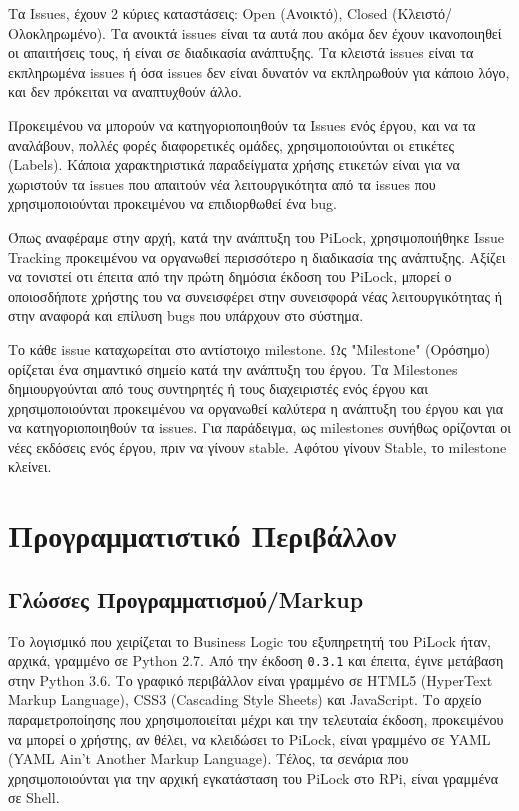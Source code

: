 		Τα Issues, έχουν 2 κύριες καταστάσεις: Open (Ανοικτό), Closed (Κλειστό/Ολοκληρωμένο). Τα ανοικτά issues είναι τα αυτά που ακόμα δεν έχουν ικανοποιηθεί οι απαιτήσεις τους, ή είναι σε διαδικασία ανάπτυξης. Τα κλειστά issues είναι τα εκπληρωμένα issues ή όσα issues δεν είναι δυνατόν να εκπληρωθούν για κάποιο λόγο, και δεν πρόκειται να αναπτυχθούν άλλο.

		Προκειμένου να μπορούν να κατηγοριοποιηθούν τα Issues ενός έργου, και να τα αναλάβουν, πολλές φορές διαφορετικές ομάδες, χρησιμοποιούνται οι ετικέτες (Labels). Κάποια χαρακτηριστικά παραδείγματα χρήσης ετικετών είναι για να χωριστούν τα issues που απαιτούν νέα λειτουργικότητα από τα issues που χρησιμοποιούνται προκειμένου να επιδιορθωθεί ένα bug.

		Όπως αναφέραμε στην αρχή, κατά την ανάπτυξη του PiLock, χρησιμοποιήθηκε Issue Tracking προκειμένου να οργανωθεί περισσότερο η διαδικασία της ανάπτυξης. Αξίζει να τονιστεί οτι έπειτα από την πρώτη δημόσια έκδοση του PiLock, μπορεί ο οποιοσδήποτε χρήστης του να συνεισφέρει στην συνεισφορά νέας λειτουργικότητας ή στην αναφορά και επίλυση bugs που υπάρχουν στο σύστημα.

		Το κάθε issue καταχωρείται στο αντίστοιχο milestone. Ως "Milestone" (Ορόσημο) ορίζεται ένα σημαντικό σημείο κατά την ανάπτυξη του έργου. Τα Milestones δημιουργούνται από τους συντηρητές ή τους διαχειριστές ενός έργου και χρησιμοποιούνται προκειμένου να οργανωθεί καλύτερα η ανάπτυξη του έργου και για να κατηγοριοποιηθούν τα issues. Για παράδειγμα, ως milestones συνήθως ορίζονται οι νέες εκδόσεις ενός έργου, πριν να γίνουν stable. Αφότου γίνουν Stable, το milestone κλείνει.

\section{Προγραμματιστικό Περιβάλλον}
	\label{sec:ides}
	\subsection{Γλώσσες Προγραμματισμού/Markup}
		Το λογισμικό που χειρίζεται το Business Logic του εξυπηρετητή του PiLock ήταν, αρχικά, γραμμένο σε Python 2.7. Από την έκδοση \verb|0.3.1| και έπειτα, έγινε μετάβαση στην Python 3.6. Το γραφικό περιβάλλον είναι γραμμένο σε HTML5 (HyperText Markup Language), CSS3 (Cascading Style Sheets) και JavaScript. Το αρχείο παραμετροποίησης που χρησιμοποιείται μέχρι και την τελευταία έκδοση, προκειμένου να μπορεί ο χρήστης, αν θέλει, να κλειδώσει το PiLock, είναι γραμμένο σε YAML (YAML Ain't Another Markup Language). Τέλος, τα σενάρια που χρησιμοποιούνται για την αρχική εγκατάσταση του PiLock στο RPi, είναι γραμμένα σε Shell.

